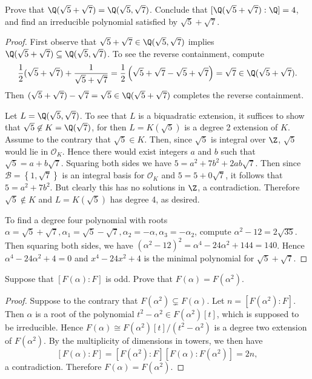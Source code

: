 \documentclass[10pt]{amsart}
\begin{document}
\begin{thm}
  Prove that $\Q(\sqrt{5} + \sqrt{7}) = \Q(\sqrt{5}, \sqrt{7})$. Conclude that $[\Q(\sqrt{5} + \sqrt{7}) : \Q] = 4$, and 
  find an irreducible polynomial satisfied by $\sqrt{5} + \sqrt{7}$.  
  \begin{proof}
    First observe that $\sqrt{5} + \sqrt{7} \in \Q(\sqrt{5}, \sqrt{7})$ implies $\Q(\sqrt{5} + \sqrt{7}) \subseteq \Q(\sqrt{5}, \sqrt{7})$.
    To see the reverse containment, compute
    $$\frac{1}{2} (\sqrt{5} + \sqrt{7}) + \frac{1}{\sqrt{5} + \sqrt{7}} = \frac{1}{2}\left(\sqrt{5} + \sqrt{7} - \sqrt{5} + \sqrt{7}\right) = \sqrt{7} \in \Q(\sqrt{5} + \sqrt{7}).$$
    Then $(\sqrt{5} + \sqrt{7}) - \sqrt{7} = \sqrt{5} \in \Q(\sqrt{5} + \sqrt{7})$ completes the reverse containment.

    Let $L = \Q(\sqrt{5}, \sqrt{7})$.
    To see that $L$ is a biquadratic extension, it suffices to show that $\sqrt{5} \not \in K = \Q(\sqrt{7})$, for then $L = K(\sqrt{5})$ is a degree 2 extension of $K$.
    Assume to the contrary that $\sqrt{5} \in K$.
    Then, since $\sqrt{5}$ is integral over $\Z$, $\sqrt{5}$ would lie in $\mathcal{O}_K$.
    Hence there would exist integers $a$ and $b$ such that $\sqrt{5} = a + b\sqrt{7}$.
    Squaring both sides we have $5 = a^2 + 7b^2 + 2ab\sqrt{7}$.
    Then since $\mathcal{B} = \left\{1, \sqrt{7}\right\}$ is an integral basis for $\mathcal{O}_K$ and $5 = 5 + 0\sqrt{7}$, it follows that $5 = a^2 + 7b^2$.
    But clearly this has no solutions in $\Z$, a contradiction.
    Therefore $\sqrt{5} \not \in K$ and $L = K(\sqrt{5})$ has degree 4, as desired.

    To find a degree four polynomial with roots $\alpha = \sqrt{5} + \sqrt{7}, \alpha_1 = \sqrt{5} - \sqrt{7}, \alpha_2 = -\alpha, \alpha_3 = -\alpha_2$, compute $\alpha^2 - 12 = 2\sqrt{35}$.
    Then squaring both sides, we have $(\alpha^2 - 12)^2 = \alpha^4 - 24\alpha^2 + 144 = 140$.
    Hence $\alpha^4 - 24\alpha^2 + 4 = 0$ and $x^4 - 24x^2 + 4$ is the minimal polynomial for $\sqrt{5} + \sqrt{7}$.
  \end{proof}
\end{thm}

\begin{thm}
  Suppose that $[F(\alpha) : F]$ is odd.  Prove that $F(\alpha) = F(\alpha^2)$.  
  \begin{proof}
    Suppose to the contrary that $F(\alpha^2) \subsetneq F(\alpha)$.
    Let $n = [F(\alpha^2):F]$.
    Then $\alpha$ is a root of the polynomial $t^2 - \alpha^2 \in F(\alpha^2)[t]$, which is supposed to be irreducible.
    Hence $F(\alpha) \cong F(\alpha^2)[t]/(t^2 - \alpha^2)$ is a degree two extension of $F(\alpha^2)$.
    By the multiplicity of dimensions in towers, we then have 
    $$[F(\alpha):F] = [F(\alpha^2):F][F(\alpha):F(\alpha^2)] = 2n,$$ 
    a contradiction.
    Therefore $F(\alpha) = F(\alpha^2)$.
  \end{proof}
\end{thm}
\end{document}

